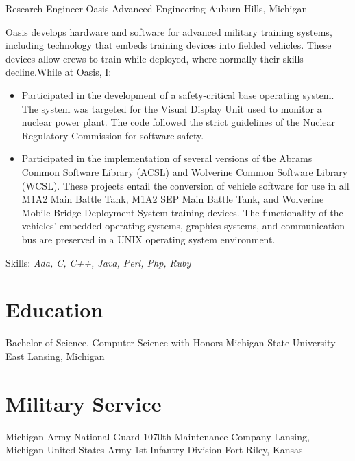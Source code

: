 \documentclass[11pt,letterpaper]{moderncv}
\begin{document}
 {Research Engineer} {Oasis Advanced Engineering} {Auburn Hills, Michigan} {} {%
  Oasis develops hardware and software for advanced military training systems,
  including technology that embeds training devices into fielded
  vehicles. These devices allow crews to train while deployed, where normally
  their skills decline.\newline While at Oasis, I:
  \begin{itemize}
  \item Participated in the development of a safety-critical base
    operating system. The system was targeted for the Visual Display
    Unit used to monitor a nuclear power plant. The code followed the
    strict guidelines of the Nuclear Regulatory Commission for
    software safety.
  \item Participated in the implementation of several versions of the
    Abrams Common Software Library (ACSL) and Wolverine Common
    Software Library (WCSL). These projects entail the conversion of
    vehicle software for use in all M1A2 Main Battle Tank, M1A2 SEP
    Main Battle Tank, and Wolverine Mobile Bridge Deployment System
    training devices. The functionality of the vehicles' embedded
    operating systems, graphics systems, and communication bus are
    preserved in a UNIX operating system environment.
  \end{itemize}
  Skills: \emph{Ada, C, C++, Java, Perl, Php, Ruby}
}


\pagebreak
\section{Education}
 {Bachelor of Science, Computer Science with Honors} {Michigan State University} {East Lansing, Michigan} {} {}

\section{Military Service}
 {Michigan Army National Guard} {\newline1070th Maintenance Company} {Lansing, Michigan} {} {}
 {United States Army} {1st Infantry Division} {Fort Riley, Kansas} {} {}
\end{document}

